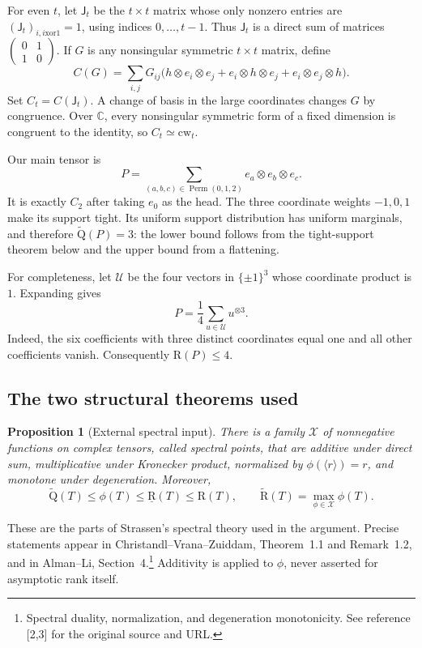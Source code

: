 \documentclass[11pt]{article}
\newtheorem{proposition}[theorem]{Proposition}
\theoremstyle{definition}\newtheorem{definition}[theorem]{Definition}
\theoremstyle{remark}\newtheorem{remark}[theorem]{Remark}
\newcommand{\AR}{\widetilde{\mathrm R}}
\newcommand{\AQ}{\widetilde{\mathrm Q}}
\newcommand{\R}{\mathrm R}
\newcommand{\BR}{\underline{\mathrm R}}
\newcommand{\perm}{\operatorname{Perm}}
\newcommand{\X}{\mathcal X}
\newcommand{\C}{\mathbb C}
\newcommand{\J}{\mathsf J}
\newcommand{\sref}[2]{\footnote{#1. See reference [#2] for the original source and URL.}}
\begin{document}
For even $t$, let $\J_t$ be the $t\times t$ matrix whose only nonzero entries are $(\J_t)_{i,i\mathbin{\mathrm{xor}}1}=1$, using indices $0,\ldots,t-1$. Thus $\J_t$ is a direct sum of matrices $\left(\begin{smallmatrix}0&1\\1&0\end{smallmatrix}\right)$. If $G$ is any nonsingular symmetric $t\times t$ matrix, define
\begin{equation}\label{eq:Cform}
 C(G)=\sum_{i,j}G_{ij}
 \bigl(h\otimes e_i\otimes e_j+e_i\otimes h\otimes e_j+e_i\otimes e_j\otimes h\bigr).
\end{equation}
Set $C_t=C(\J_t)$. A change of basis in the large coordinates changes $G$ by congruence. Over $\C$, every nonsingular symmetric form of a fixed dimension is congruent to the identity, so $C_t\simeq\mathrm{cw}_t$.

Our main tensor is
\begin{equation}\label{eq:P}
 P=\sum_{(a,b,c)\in\perm(0,1,2)}e_a\otimes e_b\otimes e_c.
\end{equation}
It is exactly $C_2$ after taking $e_0$ as the head. The three coordinate weights $-1,0,1$ make its support tight. Its uniform support distribution has uniform marginals, and therefore $\AQ(P)=3$: the lower bound follows from the tight-support theorem below and the upper bound from a flattening.

For completeness, let $\mathcal U$ be the four vectors in $\{\pm1\}^3$ whose coordinate product is $1$. Expanding gives
\[
 P=\frac14\sum_{u\in\mathcal U}u^{\otimes3}.
\]
Indeed, the six coefficients with three distinct coordinates equal one and all other coefficients vanish. Consequently $\R(P)\leq4$.

\subsection{The two structural theorems used}

\begin{proposition}[External spectral input]\label{prop:spectrum}
There is a family $\X$ of nonnegative functions on complex tensors, called spectral points, that are additive under direct sum, multiplicative under Kronecker product, normalized by $\phi(\langle r\rangle)=r$, and monotone under degeneration. Moreover,
\[
 \AQ(T)\leq\phi(T)\leq\BR(T)\leq\R(T),\qquad
 \AR(T)=\max_{\phi\in\X}\phi(T).
\]
\end{proposition}
These are the parts of Strassen's spectral theory used in the argument. Precise statements appear in Christandl--Vrana--Zuiddam, Theorem~1.1 and Remark~1.2, and in Alman--Li, Section~4.\sref{Spectral duality, normalization, and degeneration monotonicity}{2,3} Additivity is applied to $\phi$, never asserted for asymptotic rank itself.
\end{document}
